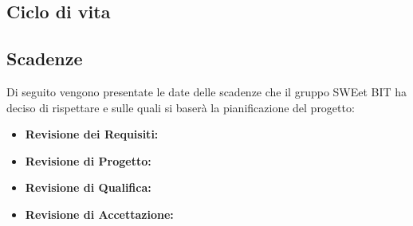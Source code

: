 \subsection{Ciclo di vita}
\subsection{Scadenze}
Di seguito vengono presentate le date delle scadenze che il gruppo SWEet BIT ha deciso di rispettare e sulle quali si baserà la pianificazione del progetto:
\begin{itemize}
	\item \textbf{Revisione dei Requisiti:} \\
	\item \textbf{Revisione di Progetto:} \\
	\item \textbf{Revisione di Qualifica:} \\
	\item \textbf{Revisione di Accettazione:} \\
\end{itemize}
